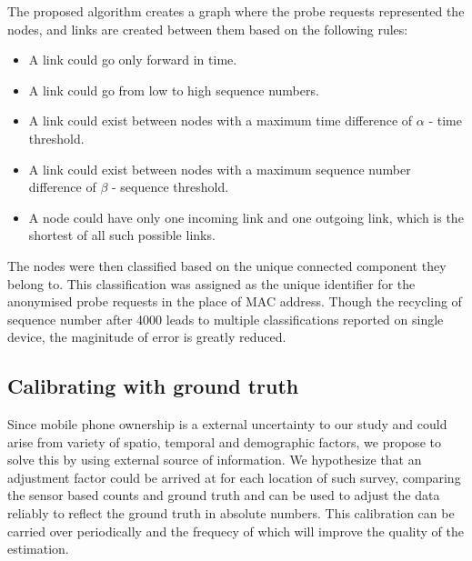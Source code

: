The proposed algorithm creates a graph where the probe requests represented the nodes, and links are created between them based on the following rules: 
\begin{itemize}
	\item A link could go only forward in time. 
	\item A link could go from low to high sequence numbers.
	\item A link could exist between nodes with a maximum time difference of $\alpha$ - time threshold.
	\item A link could exist between nodes with a maximum sequence number difference of $\beta$ - sequence threshold.
	\item A node could have only one incoming link and one outgoing link, which is the shortest of all such possible links.
\end{itemize}
The nodes were then classified based on the unique connected component they belong to.
This classification was assigned as the unique identifier for the anonymised probe requests in the place of MAC address.
Though the recycling of sequence number after 4000 leads to multiple classifications reported on single device, the maginitude of error is greatly reduced. 

\subsection{Calibrating with ground truth}
Since mobile phone ownership is a external uncertainty to our study and could arise from variety of spatio, temporal and demographic factors, we propose to solve this by using external source of information. We hypothesize that an adjustment factor could be arrived at for each location of such survey, comparing the sensor based counts and ground truth and can be used to adjust the data reliably to reflect the ground truth in absolute numbers. This calibration can be carried over periodically and the frequecy of which will improve the quality of the estimation.
